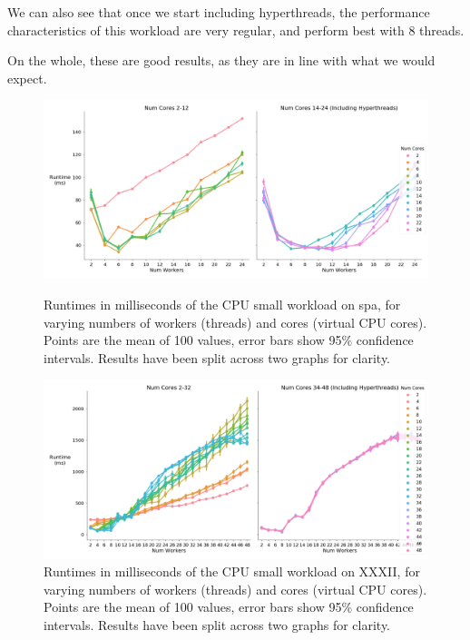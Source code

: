 We can also see that once we start including hyperthreads, the performance characteristics of this workload are very regular, and perform best with 8 threads.

On the whole, these are good results, as they are in line with what we would expect.



\begin{figure}[H]
    \vspace*{-2.5cm}
    \centerline{\includegraphics[width=1.5\textwidth]{graphics/optimal_threads/spa/optimal_threads_cpu_small.png}}
    \caption{Runtimes in milliseconds of the CPU small workload on spa, for varying numbers of workers (threads) and cores (virtual CPU cores). Points are the mean of 100 values, error bars show 95\% confidence intervals. Results have been split across two graphs for clarity.}
    \label{fig:opt_spa_cpu_small}
    
    \centerline{\includegraphics[width=1.5\textwidth]{graphics/optimal_threads/XXXII/optimal_threads_cpu_small.png}}
    \caption{Runtimes in milliseconds of the CPU small workload on XXXII, for varying numbers of workers (threads) and cores (virtual CPU cores). Points are the mean of 100 values, error bars show 95\% confidence intervals. Results have been split across two graphs for clarity.}
    \label{fig:opt_xxxii_cpu_small}
\end{figure}



